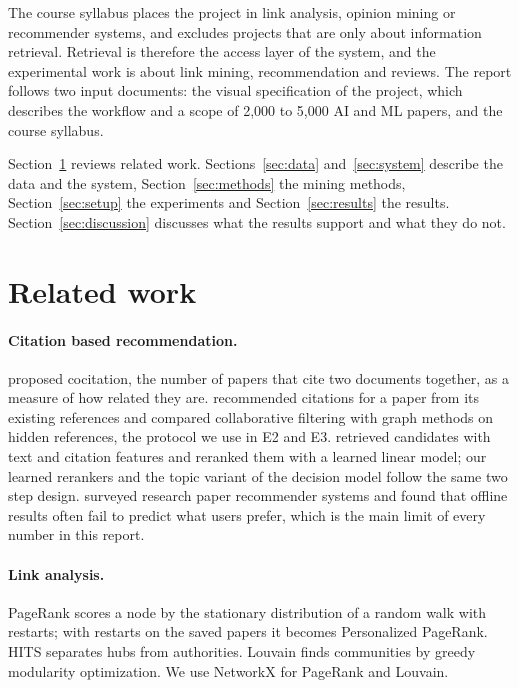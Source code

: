 \documentclass[11pt,a4paper]{article}
\begin{document}
The course syllabus places the project in link analysis, opinion mining or recommender systems, and excludes projects that are only about information retrieval. Retrieval is therefore the access layer of the system, and the experimental work is about link mining, recommendation and reviews. The report follows two input documents: the visual specification of the project, which describes the workflow and a scope of 2,000 to 5,000 AI and ML papers, and the course syllabus.

Section~\ref{sec:related} reviews related work. Sections~\ref{sec:data} and~\ref{sec:system} describe the data and the system, Section~\ref{sec:methods} the mining methods, Section~\ref{sec:setup} the experiments and Section~\ref{sec:results} the results. Section~\ref{sec:discussion} discusses what the results support and what they do not.

\section{Related work}\label{sec:related}
\paragraph{Citation based recommendation.} \citet{small1973} proposed cocitation, the number of papers that cite two documents together, as a measure of how related they are. \citet{mcnee2002} recommended citations for a paper from its existing references and compared collaborative filtering with graph methods on hidden references, the protocol we use in E2 and E3. \citet{strohman2007} retrieved candidates with text and citation features and reranked them with a learned linear model; our learned rerankers and the topic variant of the decision model follow the same two step design. \citet{beel2016} surveyed research paper recommender systems and found that offline results often fail to predict what users prefer, which is the main limit of every number in this report.

\paragraph{Link analysis.} PageRank \citep{page1999} scores a node by the stationary distribution of a random walk with restarts; with restarts on the saved papers it becomes Personalized PageRank. HITS \citep{kleinberg1999} separates hubs from authorities. Louvain \citep{blondel2008} finds communities by greedy modularity optimization. We use NetworkX \citep{networkx} for PageRank and Louvain.
\end{document}
